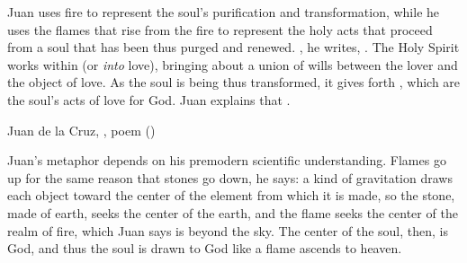 Juan uses fire to represent the soul's purification and transformation, while
he uses the flames that rise from the fire to represent the holy acts that
proceed from a soul that has been thus purged and renewed.
, he writes, .%
    \Autocite[790]{JuandelaCruz:Llama} 
The Holy Spirit works within  (or
\emph{into} love), bringing about a union of wills between the lover and the
object of love.
As the soul is being thus transformed, it gives forth , which
are the soul's acts of love for God.
Juan explains that .%
    \Autocite[790]{JuandelaCruz:Llama}

{Juan de la Cruz, , poem ()}

Juan's metaphor depends on his premodern scientific understanding. 
Flames go up for the same reason that stones go down, he says: a kind of
gravitation draws each object toward the center of the element from which it is
made, so the stone, made of earth, seeks the center of the earth, and the flame
seeks the center of the realm of fire, which Juan says is beyond the sky.%
    \Autocite[792--795]{JuandelaCruz:Llama}
The center of the soul, then, is God, and thus the soul is drawn to God like a
flame ascends to heaven.

